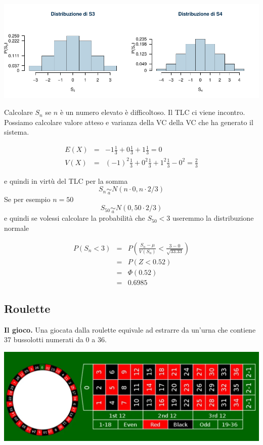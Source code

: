 \documentclass[
  11pt,
]{book}
\theoremstyle{mytheoremstyle}
\theoremstyle{mydefstyle}
\begin{document}
\begin{center}\includegraphics{Appunti_di_Statistica_2025_files/figure-latex/08-tlc-8-1} \end{center}

Calcolare \(S_n\) se \(n\) è un numero elevato è difficoltoso. Il TLC ci
viene incontro. Possiamo calcolare valore atteso e varianza della VC
della VC che ha generato il sistema.

\begin{eqnarray*}
  E(X) &=&  -1 \frac 13+0\frac 13+1 \frac 13=0\\
  V(X) &=&  (-1)^2\frac 13 +0^2\frac 13+1^2\frac 13-0^2=\frac 23
\end{eqnarray*}

e quindi in virtù del TLC per la somma \[
S_n\operatorname*{\sim}_a N(n\cdot 0, n\cdot 2/3)
\] Se per esempio \(n=50\) \[
S_{50}\operatorname*{\sim}_a N(0,50\cdot 2/3)
\] e quindi se volessi calcolare la probabilità che \(S_{50}<3\) useremmo
la distribuzione normale

\begin{eqnarray*}
      P( S_n   <   3 ) 
        &=& P\left(  \frac { S_n  -  \mu }{ V(S_n) }  <  \frac { 3  -  0 }{\sqrt{ 33.33 }} \right)  \\
                 &=& P\left(  Z   <   0.52 \right) \\    
                 &=&  \Phi( 0.52 ) \\ &=&  0.6985 
      \end{eqnarray*}

\subsection{Roulette}\label{roulette}

\textbf{Il gioco.} Una giocata dalla roulette equivale ad estrarre da un'urna
che contiene 37 bussolotti numerati da 0 a 36.

\begin{center}\includegraphics[width=7.11in,]{img/tavolo-roulette} \end{center}
\end{document}
